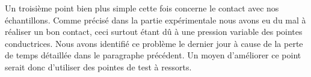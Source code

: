 \bigskip

Un troisième point bien plus simple cette fois concerne le contact avec nos échantillons. 
Comme précisé dans la partie expérimentale nous avons eu du mal à réaliser un bon contact, ceci surtout étant dû à une pression variable des pointes conductrices. Nous avons identifié ce problème le dernier jour à cause de la perte de temps détaillée dans le paragraphe précédent.  Un moyen d'améliorer ce point serait donc d'utiliser des pointes de test à ressorts.
